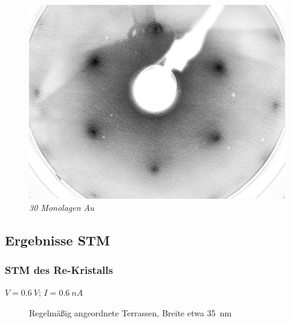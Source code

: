 \documentclass{beamer}
\begin{document}
\begin{frame}
\begin{minipage}{\linewidth}
\begin{figure}[H]
\begin{minipage}[b]{0.3\textwidth}
		\includegraphics[width=\textwidth]{bilder/30ML_E208}
		\caption*{\textit{30 Monolagen Au}}
	\end{minipage}
\end{figure}
\end{minipage}
\end{frame}



\subsection[Ergebnisse]{Ergebnisse STM}

\begin{frame}
\frametitle{STM des Re-Kristalls}
$V=\SI{0,6}{V}$; $I=\SI{0,6}{nA}$
\begin{figure}[htbp]
	\vspace{-0.5cm}
	\begin{minipage}[b]{0.45\textwidth} 
		\sffamily
		
	\end{minipage}
	\hspace{0.5cm}
	\begin{minipage}[b]{0.45\textwidth}
		\sffamily
		
	\end{minipage}
	\caption*{Regelmäßig angeordnete Terrassen, Breite etwa \SI{35}{nm}}
	\end{figure}
\end{frame}
\end{document}
